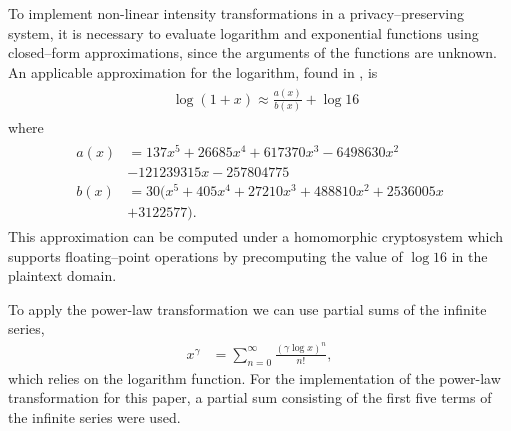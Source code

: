 To implement non-linear intensity transformations in a privacy--preserving system, it is necessary to evaluate logarithm and exponential functions using closed--form approximations, since the arguments of the functions are unknown. An applicable approximation for the logarithm, found in \cite{pcsc-paper}, is
\begin{align}\label{eq:optimal_log_approximation}
	\begin{split}
		&\log\left(1+x\right) \approx \frac{a(x)}{b(x)} + \log{16}
	\end{split}
\end{align}
where
\begin{align*}
	\begin{split}
	a(x) &= 137x^5 + 26685x^4 + 617370x^3 - 6498630x^2 \\
	&- 121239315x - 257804775\\
	b(x) &= 30(x^5 + 405x^4 + 27210x^3 + 488810x^2 + 2536005x \\
	&+ 3122577).
	\end{split}
\end{align*}
This approximation can be computed under a homomorphic cryptosystem which supports floating--point operations by precomputing the value of $\log{16}$ in the plaintext domain.

To apply the power-law transformation we can use partial sums of the infinite series,
\begin{align} \label{eq:power_approximation}
	x^\gamma &= \sum_{n=0}^{\infty}{\frac{(\gamma\log{x})^n}{n!}},
\end{align}
which relies on the logarithm function.
For the implementation of the power-law transformation for this paper, a partial sum consisting of the first five terms of the infinite series were used.
